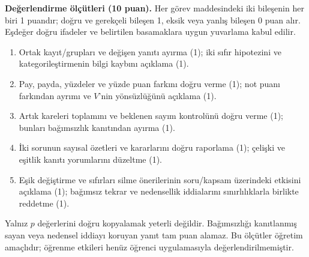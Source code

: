 \textbf{Değerlendirme ölçütleri (10 puan).} Her görev maddesindeki
iki bileşenin her biri 1 puandır; doğru ve gerekçeli bileşen 1, eksik
veya yanlış bileşen 0 puan alır. Eşdeğer doğru ifadeler ve belirtilen
basamaklara uygun yuvarlama kabul edilir.
\begin{enumerate}
  \item Ortak kayıt/grupları ve değişen yanıtı ayırma (1);
  iki sıfır hipotezini ve kategorileştirmenin bilgi kaybını açıklama (1).
  \item Pay, payda, yüzdeler ve yüzde puan farkını doğru verme (1);
  not puanı farkından ayrımı ve $V$'nin yönsüzlüğünü açıklama (1).
  \item Artık kareleri toplamını ve beklenen sayım kontrolünü
  doğru verme (1); bunları bağımsızlık kanıtından ayırma (1).
  \item İki sorunun sayısal özetleri ve kararlarını doğru
  raporlama (1); çelişki ve eşitlik kanıtı yorumlarını düzeltme (1).
  \item Eşik değiştirme ve sıfırları silme önerilerinin soru/kapsam
  üzerindeki etkisini açıklama (1); bağımsız tekrar ve nedensellik
  iddialarını sınırlılıklarla birlikte reddetme (1).
\end{enumerate}
Yalnız $p$ değerlerini doğru kopyalamak yeterli değildir. Bağımsızlığı
kanıtlanmış sayan veya nedensel iddiayı koruyan yanıt tam puan alamaz.
Bu ölçütler öğretim amaçlıdır; öğrenme etkileri henüz öğrenci
uygulamasıyla değerlendirilmemiştir.
